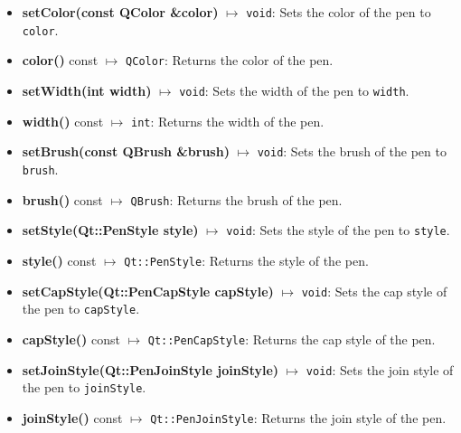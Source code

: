 \documentclass{report}
\begin{document}
    \pagebreak 
    \begin{itemize}
        \item \textbf{setColor(const QColor \&color)} $\mapsto$ \texttt{void}: Sets the color of the pen to \texttt{color}.
        \item \textbf{color()} const $\mapsto$ \texttt{QColor}: Returns the color of the pen.
        \item \textbf{setWidth(int width)} $\mapsto$ \texttt{void}: Sets the width of the pen to \texttt{width}.
        \item \textbf{width()} const $\mapsto$ \texttt{int}: Returns the width of the pen.
        \item \textbf{setBrush(const QBrush \&brush)} $\mapsto$ \texttt{void}: Sets the brush of the pen to \texttt{brush}.
        \item \textbf{brush()} const $\mapsto$ \texttt{QBrush}: Returns the brush of the pen.
        \item \textbf{setStyle(Qt::PenStyle style)} $\mapsto$ \texttt{void}: Sets the style of the pen to \texttt{style}.
        \item \textbf{style()} const $\mapsto$ \texttt{Qt::PenStyle}: Returns the style of the pen.
        \item \textbf{setCapStyle(Qt::PenCapStyle capStyle)} $\mapsto$ \texttt{void}: Sets the cap style of the pen to \texttt{capStyle}.
        \item \textbf{capStyle()} const $\mapsto$ \texttt{Qt::PenCapStyle}: Returns the cap style of the pen.
        \item \textbf{setJoinStyle(Qt::PenJoinStyle joinStyle)} $\mapsto$ \texttt{void}: Sets the join style of the pen to \texttt{joinStyle}.
        \item \textbf{joinStyle()} const $\mapsto$ \texttt{Qt::PenJoinStyle}: Returns the join style of the pen.
    \end{itemize}
\end{document}
